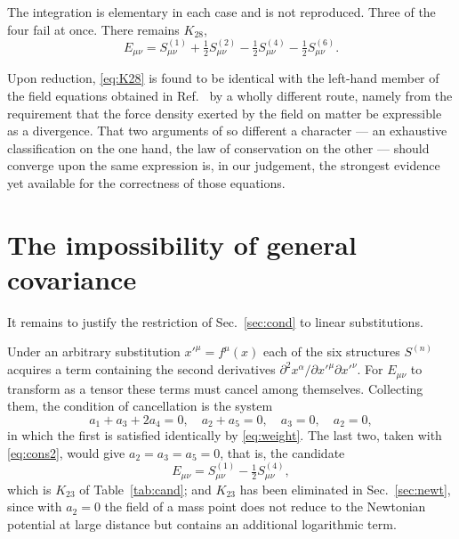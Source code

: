 \documentclass[aps,prd,reprint,amsmath,amssymb,nofootinbib,longbibliography]{revtex4-2}
\begin{document}
The integration is elementary in each case and is not reproduced. Three of the four fail at once.
There remains $K_{28}$,
\begin{equation}
E_{\mu\nu} = S^{(1)}_{\mu\nu} + \tfrac{1}{2}S^{(2)}_{\mu\nu} - \tfrac{1}{2}S^{(4)}_{\mu\nu}
           - \tfrac{1}{2}S^{(6)}_{\mu\nu} .
\label{eq:K28}
\end{equation}

Upon reduction, \eqref{eq:K28} is found to be identical with the left-hand member of the field
equations obtained in Ref.~\cite{eingross1913} by a wholly different route, namely from the
requirement that the force density exerted by the field on matter be expressible as a divergence.
That two arguments of so different a character --- an exhaustive classification on the one hand, the
law of conservation on the other --- should converge upon the same expression is, in our judgement,
the strongest evidence yet available for the correctness of those equations.

\section{The impossibility of general covariance}
\label{sec:cov}

It remains to justify the restriction of Sec.~\ref{sec:cond} to linear substitutions.

Under an arbitrary substitution $x'^{\mu} = f^{\mu}(x)$ each of the six structures $S^{(n)}$
acquires a term containing the second derivatives $\partial^{2} x^{\alpha}/\partial x'^{\mu}
\partial x'^{\nu}$. For $E_{\mu\nu}$ to transform as a tensor these terms must cancel among
themselves. Collecting them, the condition of cancellation is the system
\begin{equation}
a_1 + a_3 + 2 a_4 = 0 , \quad a_2 + a_5 = 0 , \quad a_3 = 0 , \quad a_2 = 0 ,
\label{eq:covcond}
\end{equation}
in which the first is satisfied identically by \eqref{eq:weight}. The last two, taken with
\eqref{eq:cons2}, would give $a_2 = a_3 = a_5 = 0$, that is, the candidate
\begin{equation}
E_{\mu\nu} = S^{(1)}_{\mu\nu} - \tfrac{1}{2} S^{(4)}_{\mu\nu} ,
\end{equation}
which is $K_{23}$ of Table~\ref{tab:cand}; and $K_{23}$ has been eliminated in Sec.~\ref{sec:newt},
since with $a_2 = 0$ the field of a mass point does not reduce to the Newtonian potential at
large distance but contains an additional logarithmic term.
\end{document}
